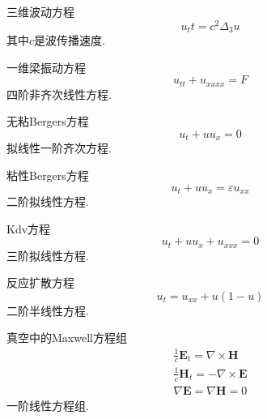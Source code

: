 	\begin{myexample}
		三维波动方程
		\begin{equation}
			u_tt = c^2 \Delta_3 u
		\end{equation}
		其中$c$是波传播速度.
	\end{myexample}

	\begin{myexample}
		一维梁振动方程
		\begin{equation}
			u_{tt} + u_{xxxx} = F
		\end{equation}
		四阶非齐次线性方程.
	\end{myexample}

	\begin{myexample}
		无粘Bergers方程
		\begin{equation}
			u_t + uu_x = 0
		\end{equation}
		拟线性一阶齐次方程.
	\end{myexample}

	\begin{myexample}
		粘性Bergers方程
		\begin{equation}
			u_t + uu_x = \varepsilon u_{xx}
		\end{equation}
		二阶拟线性方程.
	\end{myexample}
	
	\begin{myexample}
		Kdv方程
		\begin{equation}
			u_t + uu_x + u_{xxx} = 0
		\end{equation}
		三阶拟线性方程.
	\end{myexample}

	\begin{myexample}
		反应扩散方程
		\begin{equation}
			u_t = u_{xx} + u(1-u) 
		\end{equation}
		二阶半线性方程.
	\end{myexample}

	\begin{myexample}
		真空中的Maxwell方程组
		\begin{subequations}
			\begin{align}
			\frac{1}{c}\mathbf{E}_t = \nabla \times \mathbf{H} \\
			\frac{1}{c}\mathbf{H}_t = -\nabla \times \mathbf{E} \\
			\nabla \mathbf{E} = \nabla \mathbf{H} = 0
			\end{align}
		\end{subequations}
	一阶线性方程组.
	\end{myexample}

